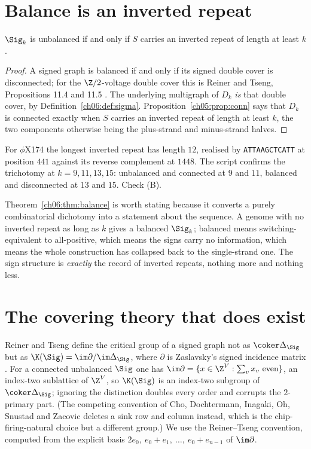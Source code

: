 \section{Balance is an inverted repeat}\label{ch06:sec:balance}

\begin{theorem}\label{ch06:thm:balance}
$\Sig_k$ is unbalanced if and only if $S$ carries an inverted repeat of length at least $k$.
\end{theorem}

\begin{proof}
A signed graph is balanced if and only if its signed double cover is disconnected; for the
$\Z/2$-voltage double cover this is Reiner and Tseng, Propositions 11.4 and 11.5
\cite{RT14}. The underlying multigraph of $D_k$ \emph{is} that double cover, by
Definition~\ref{ch06:def:sigma}. Proposition~\ref{ch05:prop:conn} says that $D_k$ is connected exactly when
$S$ carries an inverted repeat of length at least $k$, the two components otherwise being
the plus-strand and minus-strand halves.
\end{proof}

For $\phi$X174 the longest inverted repeat has length $12$, realised by
\texttt{ATTAAGCTCATT} at position $441$ against its reverse complement at $1448$. The script
confirms the trichotomy at $k=9,11,13,15$: unbalanced and connected at $9$ and $11$,
balanced and disconnected at $13$ and $15$. Check (B).

Theorem~\ref{ch06:thm:balance} is worth stating because it converts a purely combinatorial
dichotomy into a statement about the sequence. A genome with no inverted repeat as long as
$k$ gives a balanced $\Sig_k$; balanced means switching-equivalent to all-positive, which
means the signs carry no information, which means the whole construction has collapsed back
to the single-strand one. The sign structure is \emph{exactly} the record of inverted
repeats, nothing more and nothing less.

\section{The covering theory that does exist}\label{ch06:sec:rt}

Reiner and Tseng define the critical group of a signed graph not as $\coker\Delta_\Sig$ but
as $\K(\Sig)=\im\partial/\im\Delta_\Sig$, where $\partial$ is Zaslavsky's signed incidence
matrix \cite[eq.~(1.3), \S9]{RT14}. For a connected unbalanced $\Sig$ one has
$\im\partial=\{x\in\Z^V:\sum_v x_v\ \text{even}\}$, an index-two sublattice of $\Z^V$, so
$\K(\Sig)$ is an index-two subgroup of $\coker\Delta_\Sig$; ignoring the distinction doubles
every order and corrupts the $2$-primary part. (The competing convention of Cho, Dochtermann,
Inagaki, Oh, Snustad and Zacovic \cite{CDIOSZ} deletes a sink row and column instead, which
is the chip-firing-natural choice but a different group.) We use the Reiner--Tseng
convention, computed from the explicit basis $2e_0,\ e_0+e_1,\ \dots,\ e_0+e_{n-1}$ of
$\im\partial$.

